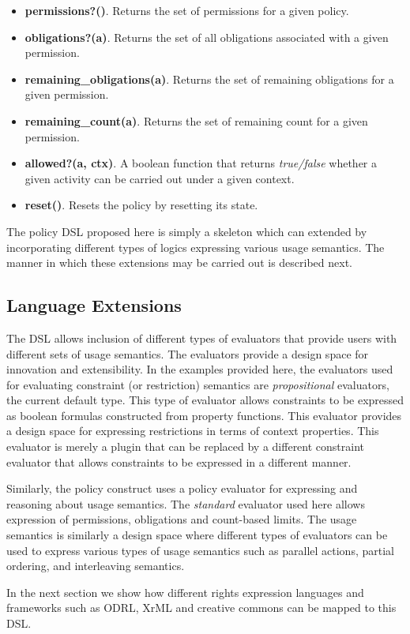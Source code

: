\begin{itemize}
\item {\bf permissions?()}. Returns the set of permissions for a given policy.
\item {\bf obligations?(a)}. Returns the set of all obligations associated with a given permission. 
\item {\bf remaining\_obligations(a)}. Returns the set of remaining obligations for a given permission. 
\item {\bf remaining\_count(a)}. Returns the set of remaining count for a given permission. 
\item {\bf allowed?(a, ctx)}. A boolean function that returns {\em true/false} whether a given activity can be carried out under a given context. 
\item {\bf reset()}. Resets the policy by resetting its state. 
\end{itemize}

The policy DSL proposed here is simply a skeleton which can extended by incorporating different types of logics expressing various usage semantics. The manner in which these extensions may be carried out is described next. 

\subsection{Language Extensions}

The DSL allows inclusion of different types of evaluators that provide users with different sets of usage semantics. The evaluators provide a design space for innovation and extensibility. In the examples provided here, the evaluators used for evaluating constraint (or restriction) semantics are {\em propositional} evaluators, the current default type. This type of evaluator allows constraints to be expressed as boolean formulas constructed from property functions. This evaluator provides a design space for expressing restrictions in terms of context properties. This evaluator is merely a plugin that can be replaced by a different constraint evaluator that allows constraints to be expressed in a different manner. 

Similarly, the policy construct uses a policy evaluator for expressing and reasoning about usage semantics. The {\em standard} evaluator used here allows expression of permissions, obligations and count-based limits. The usage semantics is similarly a design space where different types of evaluators can be used to express various types of usage semantics such as parallel actions, partial ordering, and interleaving semantics.

In the next section we show how different rights expression languages and frameworks such as ODRL, XrML and creative commons can be mapped to this DSL. 